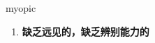 
\begin{frame}
{\huge myopic}
\begin{center}
\begin{enumerate}\Large
  \item \textbf{缺乏远见的，缺乏辨别能力的}
\end{enumerate}
\end{center}
\end{frame}
